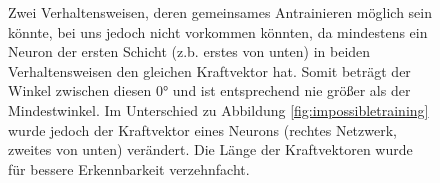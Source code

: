 \begin{figure}
    \centering
    \caption{Zwei Verhaltensweisen, deren gemeinsames Antrainieren möglich sein könnte, bei uns jedoch nicht vorkommen könnten, da mindestens ein Neuron der ersten Schicht (z.b. erstes von unten) in beiden Verhaltensweisen den gleichen Kraftvektor hat. Somit beträgt der Winkel zwischen diesen \ang{0} und ist entsprechend nie größer als der Mindestwinkel. Im Unterschied zu Abbildung \ref{fig:impossibletraining} wurde jedoch der Kraftvektor eines Neurons (rechtes Netzwerk, zweites von unten) verändert. Die Länge der Kraftvektoren wurde für bessere Erkennbarkeit verzehnfacht.}
    \label{fig:notimpossibletraining}
\end{figure}

